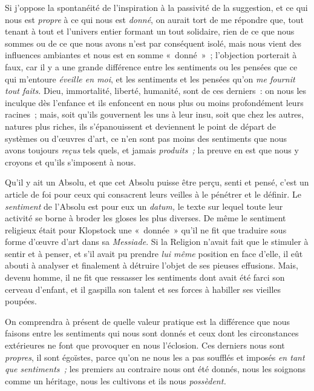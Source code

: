 \documentclass[french,twoside]{book} %
\begin{document}
\noindent Si j’oppose la spontanéité de l’inspiration à la passivité de la suggestion, et ce qui nous est \emph{propre} à ce qui nous est \emph{donné}, on aurait tort de me répondre que, tout tenant à tout et l’univers entier formant un tout solidaire, rien de ce que nous sommes ou de ce que nous avons n’est par conséquent isolé, mais nous vient des influences ambiantes et nous est en somme « donné » ; l’objection porterait à faux, car il y a une grande différence entre les sentiments ou les pensées que ce qui m’entoure \emph{éveille en moi}, et les sentiments et les pensées qu’on \emph{me fournit tout faits.}  Dieu, immortalité, liberté, humanité, sont de ces derniers : on nous les inculque dès l’enfance et ils enfoncent en nous plus ou moins profondément leurs racines ; mais, soit qu’ils gouvernent les uns à leur insu, soit que chez les autres, natures plus riches, ils s’épanouissent et deviennent le point de départ de systèmes ou d’œuvres d’art, ce n’en sont pas moins des sentiments que nous avons toujours \emph{reçus }tels quels, et jamais \emph{produits ;} la preuve en est que nous y croyons et qu’ils s’imposent à nous.\par
Qu’il y ait un Absolu, et que cet Absolu puisse être perçu, senti et pensé, c’est un article de foi pour ceux qui consacrent leurs veilles à le pénétrer et le définir. Le \emph{sentiment} de l’Absolu est pour eux un \emph{datum, }le texte sur lequel toute leur activité se borne à broder les gloses les plus diverses. De même le sentiment religieux était pour Klopstock une « donnée » qu’il ne fit que traduire sous forme d’œuvre d’art dans sa \emph{Messiade}. Si la Religion n’avait fait que le stimuler à sentir et à penser, et s’il avait pu prendre \emph{lui même }position en face d’elle, il eût abouti à analyser et finalement à détruire l’objet de ses pieuses effusions. Mais, devenu homme, il ne fit que ressasser les sentiments dont avait été farci son cerveau d’enfant, et il gaspilla son talent et ses forces à habiller ses vieilles poupées.\par
On comprendra à présent de quelle valeur pratique est la différence que nous faisons entre les sentiments qui nous sont donnés et ceux dont les circonstances extérieures ne font que provoquer en nous l’éclosion. Ces derniers nous sont \emph{propres}, il sont égoïstes, parce qu’on ne nous les a pas soufflés et imposés \emph{en tant que sentiments ;} les premiers au contraire nous ont été donnés, nous les soignons comme un héritage, nous les cultivons et ils nous \emph{possèdent.}\par
\end{document}
